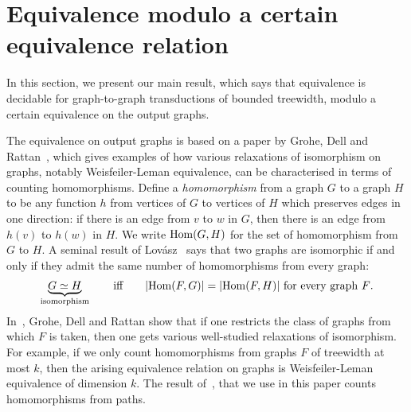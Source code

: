 
\section{Equivalence  modulo a certain equivalence relation}\label{sec:equivalence-modulo}
In this section, we present our main result, which says  that equivalence is decidable for graph-to-graph transductions of bounded treewidth, modulo a certain equivalence on the output graphs. 

 The equivalence on output graphs is based on a paper by Grohe, Dell and Rattan~\cite{groheDellRattan2018}, which gives examples of how various relaxations of isomorphism on graphs, notably Weisfeiler-Leman equivalence, can be characterised in terms of counting homomorphisms. 
Define a \emph{homomorphism} from a graph $G$ to a graph $H$ to be any function $h$ from vertices of $G$ to vertices of $H$ which preserves edges in one direction: if there is an edge from $v$ to $w$ in $G$, then there is an edge from $h(v)$ to $h(w)$ in $H$. We write $\mathrm {Hom}(G,H)$ for the set of homomorphism from $G$ to $H$. A seminal result of  Lov\'asz~\cite[p.~326]{lovasz1967operations} says that two graphs are isomorphic if and only if they admit the same number of homomorphisms from every graph:
\begin{align*}
\underbrace{G \simeq H}_{\text{isomorphism}} \qquad \text{iff} \qquad  |\mathrm {Hom}(F,G)|=|\mathrm {Hom}(F,H)| \ \text{for every graph $F$.}
\end{align*}
In~\cite{groheDellRattan2018},
Grohe, Dell and Rattan show that if one restricts the  class of graphs from which $F$ is taken, then one gets various well-studied relaxations of isomorphism. For example, if we only count homomorphisms from graphs $F$ of treewidth at most $k$, then the arising equivalence relation on graphs is Weisfeiler-Leman equivalence of dimension $k$.  The result of~\cite{groheDellRattan2018},  that we use in this paper counts homomorphisms from paths.

